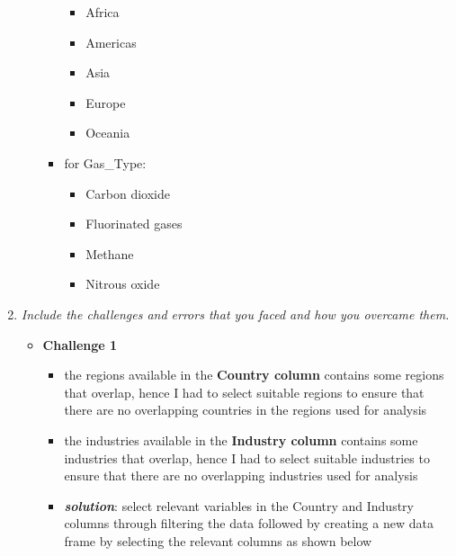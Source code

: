 \documentclass[
]{article}
\begin{document}
\begin{enumerate}
\begin{itemize}
\begin{itemize}
      \begin{itemize}
      \item
        Africa
      \item
        Americas
      \item
        Asia
      \item
        Europe
      \item
        Oceania
      \end{itemize}
    \item
      for Gas\_Type:

      \begin{itemize}
      \item
        Carbon dioxide
      \item
        Fluorinated gases
      \item
        Methane
      \item
        Nitrous oxide
      \end{itemize}
    \end{itemize}
  \end{itemize}
\item
  \emph{Include the challenges and errors that you faced and how you
  overcame them.}

  \begin{itemize}
  \item
    \textbf{Challenge 1}

    \begin{itemize}
    \item
      the regions available in the \textbf{Country column} contains some
      regions that overlap, hence I had to select suitable regions to
      ensure that there are no overlapping countries in the regions used
      for analysis
    \item
      the industries available in the \textbf{Industry column} contains
      some industries that overlap, hence I had to select suitable
      industries to ensure that there are no overlapping industries used
      for analysis
    \item
      \textbf{\emph{solution}}: select relevant variables in the Country
      and Industry columns through filtering the data followed by
      creating a new data frame by selecting the relevant columns as
      shown below
    \end{itemize}
  \end{itemize}


\end{enumerate}
\end{document}
